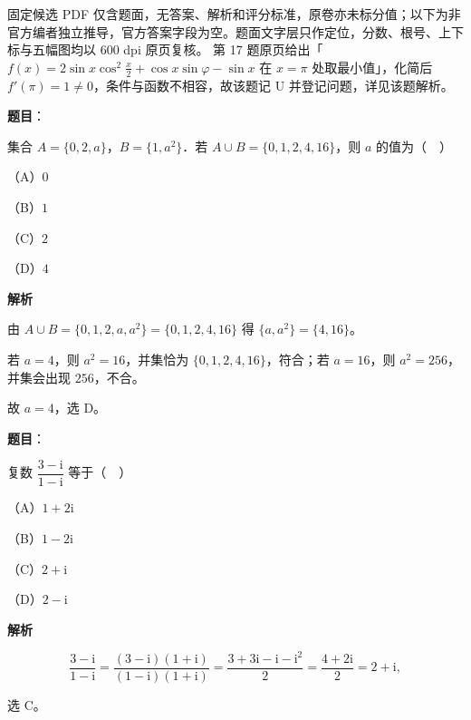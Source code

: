 

\begin{gktip}
固定候选 PDF 仅含题面，无答案、解析和评分标准，原卷亦未标分值；以下为非官方编者独立推导，官方答案字段为空。题面文字层只作定位，分数、根号、上下标与五幅图均以 600 dpi 原页复核。
第 17 题原页给出「$f(x)=2\sin x\cos^2\frac x2+\cos x\sin\varphi-\sin x$ 在 $x=\pi$ 处取最小值」，化简后 $f'(\pi)=1\neq0$，条件与函数不相容，故该题记 U 并登记问题，详见该题解析。
\end{gktip}

\begin{answer}

\textbf{题目}：

集合 $A=\{0,2,a\}$，$B=\{1,a^2\}$．若 $A\cup B=\{0,1,2,4,16\}$，则 $a$ 的值为（　）

（A）$0$

（B）$1$

（C）$2$

（D）$4$

\textbf{解析}

由 $A\cup B=\{0,1,2,a,a^2\}=\{0,1,2,4,16\}$ 得 $\{a,a^2\}=\{4,16\}$。

若 $a=4$，则 $a^2=16$，并集恰为 $\{0,1,2,4,16\}$，符合；若 $a=16$，则 $a^2=256$，并集会出现 $256$，不合。

故 $a=4$，选 D。


\end{answer}
\begin{answer}

\textbf{题目}：

复数 $\dfrac{3-\mathrm i}{1-\mathrm i}$ 等于（　）

（A）$1+2\mathrm i$

（B）$1-2\mathrm i$

（C）$2+\mathrm i$

（D）$2-\mathrm i$

\textbf{解析}

\nopagebreak[4]
\[\frac{3-\mathrm i}{1-\mathrm i}
=\frac{(3-\mathrm i)(1+\mathrm i)}{(1-\mathrm i)(1+\mathrm i)}
=\frac{3+3\mathrm i-\mathrm i-\mathrm i^2}{2}
=\frac{4+2\mathrm i}{2}=2+\mathrm i,\]

选 C。


\end{answer}

